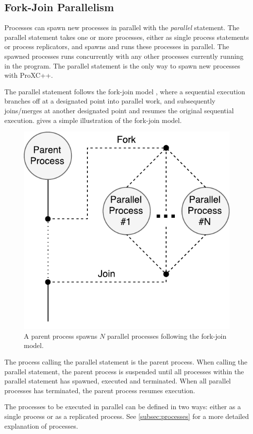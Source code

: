 \subsection{Fork\hyp{}Join Parallelism}


Processes can spawn new processes in parallel with the \textit{parallel} statement. The parallel statement takes one or more processes, either as single process statements or process replicators, and spawns and runs these processes in parallel. The spawned processes runs concurrently with any other processes currently running in the program. The parallel statement is the only way to spawn new processes with ProXC++.

The parallel statement follows the fork\hyp{}join model \citep[page 88]{mccool2012structured}, where a sequential execution branches off at a designated point into parallel work, and subsequently joins/merges at another designated point and resumes the original sequential execution.  gives a simple illustration of the fork\hyp{}join model.

\begin{figure}[h!]
    \centering
    \includegraphics[width=0.6\linewidth]{fig/fork_join}
    \caption{A parent process spawns $N$ parallel processes following the fork\hyp{}join model.}
    \label{fig:fork_join_model}
\end{figure}

The process calling the parallel statement is the parent process. When calling the parallel statement, the parent process is suspended until all processes within the parallel statement has spawned, executed and terminated. When all parallel processes has terminated, the parent process resumes execution. 

The processes to be executed in parallel can be defined in two ways: either as a single process or as a replicated process. See \cref{subsec:processes} for a more detailed explanation of processes. 

